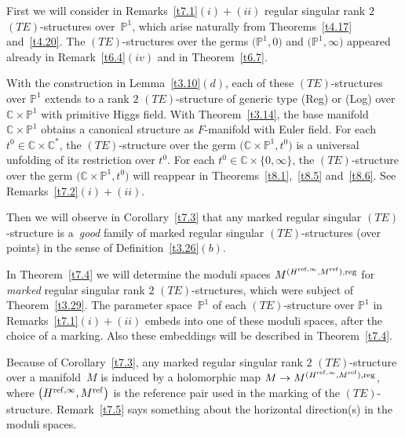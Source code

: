 \documentclass[pdftex]{sigma}%
\numberwithin{equation}{section}
\numberwithin{figure}{section}
\newcommand{\C}{{\mathbb C}}
\renewcommand{\P}{{\mathbb P}}
\begin{document}
First we will consider in Remarks~\ref{t7.1}$(i){+}(ii)$
regular singular rank $2$ $(TE)$-structures over~$\P^1$,
which arise naturally
from Theorems~\ref{t4.17} and~\ref{t4.20}.
The $(TE)$-structures over the germs
$\big(\P^1,0\big)$ and $\big(\P^1,\infty\big)$ appeared already
in Remark~\ref{t6.4}$(iv)$ and in Theorem~\ref{t6.7}.

With the construction in Lemma~\ref{t3.10}$(d)$,
each of these $(TE)$-structures over $\P^1$
extends to a rank $2$ $(TE)$-structure
of generic type (Reg) or (Log)
over $\C\times\P^1$ with primitive Higgs field.
With Theorem~\ref{t3.14}, the base manifold
$\C\times\P^1$ obtains a canonical structure
as $F$-manifold with Euler field.
For each $t^0\in\C\times\C^*$, the $(TE)$-structure
over the germ $\big(\C\times\P^1,t^0\big)$ is a universal
unfolding of its restriction over $t^0$.
For each $t^0\in\C\times\{0,\infty\}$, the
$(TE)$-structure over the germ
$\big(\C\times \P^1,t^0\big)$ will reappear in Theorems~\ref{t8.1},~\ref{t8.5} and~\ref{t8.6}.
See Remarks~\ref{t7.2}$(i){+}(ii)$.


Then we will observe in Corollary~\ref{t7.3} that
any marked regular singular $(TE)$-structure
is a~{\it good} family of marked regular singular
$(TE)$-structures (over points) in the sense of Definition~\ref{t3.26}$(b)$.

In Theorem~\ref{t7.4} we will determine the moduli spaces
$M^{(H^{{\rm ref},\infty},M^{\rm ref}),{\rm reg}}$
for {\it marked} regular singular
rank $2$ $(TE)$-structures, which were subject of
Theorem~\ref{t3.29}. The parameter space~$\P^1$ of each
$(TE)$-structure over $\P^1$ in Remarks~\ref{t7.1}$(i){+}(ii)$
embeds into one of these moduli spaces, after the choice
of a marking. Also these embeddings will be described
in Theorem~\ref{t7.4}.

Because of Corollary~\ref{t7.3}, any marked
regular singular rank $2$ $(TE)$-structure
over a mani\-fold~$M$ is induced by a holomorphic map
$M\to M^{(H^{{\rm ref},\infty},M^{\rm ref}),{\rm reg}}$,
where $\big(H^{{\rm ref},\infty},M^{\rm ref}\big)$ is the reference
pair used in the marking of the $(TE)$-structure.
Remark~\ref{t7.5} says something about the
horizontal direction(s) in the moduli spaces.
\end{document}
